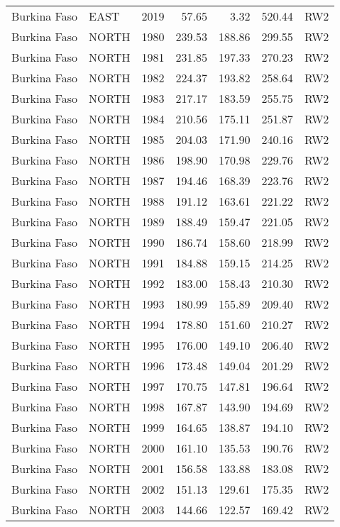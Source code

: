 \begin{longtable}{lllrrrl}
  Burkina Faso & EAST & 2019 & 57.65 & 3.32 & 520.44 & RW2 \\ 
  Burkina Faso & NORTH & 1980 & 239.53 & 188.86 & 299.55 & RW2 \\ 
  Burkina Faso & NORTH & 1981 & 231.85 & 197.33 & 270.23 & RW2 \\ 
  Burkina Faso & NORTH & 1982 & 224.37 & 193.82 & 258.64 & RW2 \\ 
  Burkina Faso & NORTH & 1983 & 217.17 & 183.59 & 255.75 & RW2 \\ 
  Burkina Faso & NORTH & 1984 & 210.56 & 175.11 & 251.87 & RW2 \\ 
  Burkina Faso & NORTH & 1985 & 204.03 & 171.90 & 240.16 & RW2 \\ 
  Burkina Faso & NORTH & 1986 & 198.90 & 170.98 & 229.76 & RW2 \\ 
  Burkina Faso & NORTH & 1987 & 194.46 & 168.39 & 223.76 & RW2 \\ 
  Burkina Faso & NORTH & 1988 & 191.12 & 163.61 & 221.22 & RW2 \\ 
  Burkina Faso & NORTH & 1989 & 188.49 & 159.47 & 221.05 & RW2 \\ 
  Burkina Faso & NORTH & 1990 & 186.74 & 158.60 & 218.99 & RW2 \\ 
  Burkina Faso & NORTH & 1991 & 184.88 & 159.15 & 214.25 & RW2 \\ 
  Burkina Faso & NORTH & 1992 & 183.00 & 158.43 & 210.30 & RW2 \\ 
  Burkina Faso & NORTH & 1993 & 180.99 & 155.89 & 209.40 & RW2 \\ 
  Burkina Faso & NORTH & 1994 & 178.80 & 151.60 & 210.27 & RW2 \\ 
  Burkina Faso & NORTH & 1995 & 176.00 & 149.10 & 206.40 & RW2 \\ 
  Burkina Faso & NORTH & 1996 & 173.48 & 149.04 & 201.29 & RW2 \\ 
  Burkina Faso & NORTH & 1997 & 170.75 & 147.81 & 196.64 & RW2 \\ 
  Burkina Faso & NORTH & 1998 & 167.87 & 143.90 & 194.69 & RW2 \\ 
  Burkina Faso & NORTH & 1999 & 164.65 & 138.87 & 194.10 & RW2 \\ 
  Burkina Faso & NORTH & 2000 & 161.10 & 135.53 & 190.76 & RW2 \\ 
  Burkina Faso & NORTH & 2001 & 156.58 & 133.88 & 183.08 & RW2 \\ 
  Burkina Faso & NORTH & 2002 & 151.13 & 129.61 & 175.35 & RW2 \\ 
  Burkina Faso & NORTH & 2003 & 144.66 & 122.57 & 169.42 & RW2 \\ 

\end{longtable}
